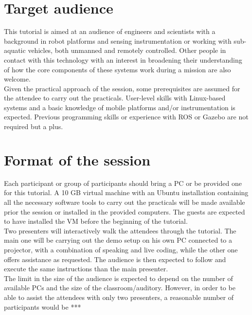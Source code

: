 \documentclass[
10pt, %
a4paper, %
oneside, %
BCOR5mm, %
]{scrartcl}
\begin{document}

\section{Target audience}
\label{sec:audience}
This tutorial is aimed at an audience of engineers and scientists with a background in robot platforms and sensing instrumentation or working with sub-aquatic vehicles, both unmanned and remotely controlled.
Other people in contact with this technology with an interest in broadening their understanding of how the core components of these systems work during a mission are also welcome.
\\
Given the practical approach of the session, some prerequisites are assumed for the attendee to carry out the practicals.
User-level skills with Linux-based systems and a basic knowledge of mobile platforms and/or instrumentation is expected.
Previous programming skills or experience with ROS or Gazebo are not required but a plus.


\section{Format of the session}
\label{sec:format}
Each participant or group of participants should bring a PC or be provided one for this tutorial.
A 10 GB virtual machine with an Ubuntu installation containing all the necessary software tools to carry out the practicals will be made available prior the session or installed in the provided computers. 
The guests are expected to have installed the VM before the beginning of the tutorial.
\\
Two presenters will interactively walk the attendees through the tutorial. 
The main one will be carrying out the demo setup on his own PC connected to a projector, with a combination of speaking and live coding, while the other one offers assistance as requested. 
The audience is then expected to follow and execute the same instructions than the main presenter.
\\ 
The limit in the size of the audience is expected to depend on the number of available PCs and the size of the classroom/auditory.
However, in order to be able to assist the attendees with only two presenters, a reasonable number of participants would be ***
\end{document}
